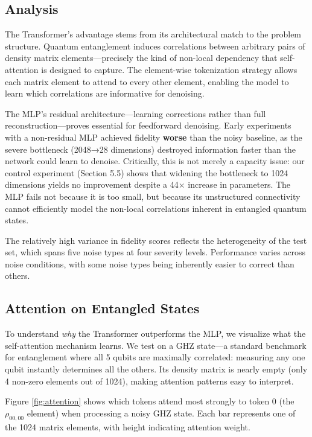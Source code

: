 \documentclass[11pt]{article}
\begin{document}
\subsection{Analysis}
\label{sec:orge7cea2b}
The Transformer's advantage stems from its architectural match to the problem structure. Quantum entanglement induces correlations between arbitrary pairs of density matrix elements—precisely the kind of non-local dependency that self-attention is designed to capture. The element-wise tokenization strategy allows each matrix element to attend to every other element, enabling the model to learn which correlations are informative for denoising.

The MLP's residual architecture—learning corrections rather than full reconstruction—proves essential for feedforward denoising. Early experiments with a non-residual MLP achieved fidelity \textbf{worse} than the noisy baseline, as the severe bottleneck (2048→28 dimensions) destroyed information faster than the network could learn to denoise. Critically, this is not merely a capacity issue: our control experiment (Section 5.5) shows that widening the bottleneck to 1024 dimensions yields no improvement despite a 44× increase in parameters. The MLP fails not because it is too small, but because its unstructured connectivity cannot efficiently model the non-local correlations inherent in entangled quantum states.

The relatively high variance in fidelity scores reflects the heterogeneity of the test set, which spans five noise types at four severity levels. Performance varies across noise conditions, with some noise types being inherently easier to correct than others.
\subsection{Attention on Entangled States}
\label{sec:org9932df9}

To understand \emph{why} the Transformer outperforms the MLP, we visualize what the self-attention mechanism learns. We test on a GHZ state—a standard benchmark for entanglement where all 5 qubits are maximally correlated: measuring any one qubit instantly determines all the others. Its density matrix is nearly empty (only 4 non-zero elements out of 1024), making attention patterns easy to interpret.

Figure \ref{fig:attention} shows which tokens attend most strongly to token 0 (the \(\rho_{00,00}\) element) when processing a noisy GHZ state. Each bar represents one of the 1024 matrix elements, with height indicating attention weight.
\end{document}
